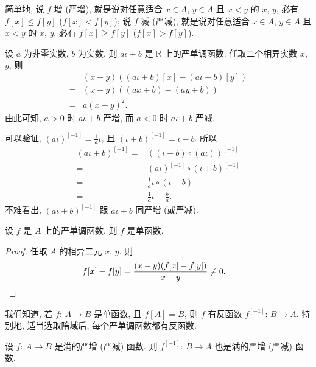 简单地, 说 $f$ 增 (严增), 就是说对任意适合 $x \in A$, $y \in A$ 且 $x < y$ 的 $x$, $y$, 必有 $f[x] \leq f[y]$ ($f[x] < f[y]$); 说 $f$ 减 (严减), 就是说对任意适合 $x \in A$, $y \in A$ 且 $x < y$ 的 $x$, $y$, 必有 $f[x] \geq f[y]$ ($f[x] > f[y]$).

\begin{example}
    设 $a$ 为非零实数, $b$ 为实数. 则 $a\iota + b$ 是 $\mathbb{R}$ 上的严单调函数. 任取二个相异实数 $x$, $y$, 则
    \begin{align*}
             & (x - y)((a\iota + b)[x] - (a\iota + b)[y]) \\
        = {} & (x - y)((ax + b) - (ay + b))               \\
        = {} & a(x - y)^2.
    \end{align*}
    由此可知, $a > 0$ 时 $a\iota + b$ 严增, 而 $a < 0$ 时 $a\iota + b$ 严减.

    可以验证, $(a\iota)^{[-1]} = \frac{1}{a} \iota$, 且 $(\iota + b)^{[-1]} = \iota - b$. 所以
    \begin{align*}
        (a\iota + b)^{[-1]}
        = {} & ((\iota + b) \circ (a\iota))^{[-1]}      \\
        = {} & (a\iota)^{[-1]} \circ (\iota + b)^{[-1]} \\
        = {} & \frac{1}{a} \iota \circ (\iota - b)      \\
        = {} & \frac{1}{a} \iota - \frac{b}{a}.
    \end{align*}
    不难看出, $(a\iota + b)^{[-1]}$ 跟 $a\iota + b$ 同严增 (或严减).
\end{example}

\begin{theorem}
    设 $f$ 是 $A$ 上的严单调函数. 则 $f$ 是单函数.
\end{theorem}

\begin{proof}
    任取 $A$ 的相异二元 $x$, $y$. 则
    \begin{align*}
         & f[x] - f[y] = \frac{(x - y)(f[x] - f[y])}{x - y} \neq 0. \qedhere
    \end{align*}
\end{proof}

我们知道, 若 $f$: $A \to B$ 是单函数, 且 $f[A] = B$, 则 $f$ 有反函数 $f^{[-1]}$: $B \to A$. 特别地, 适当选取陪域后, 每个严单调函数都有反函数.

\begin{theorem}
    设 $f$: $A \to B$ 是满的严增 (严减) 函数. 则 $f^{[-1]}$: $B \to A$ 也是满的严增 (严减) 函数.
\end{theorem}

